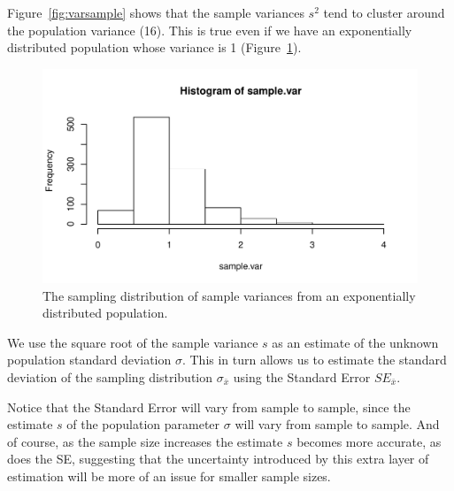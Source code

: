 \documentclass[12pt]{book}\usepackage[]{graphicx}\usepackage[]{color}
\makeatletter
\def\maxwidth{ %
  \ifdim\Gin@nat@width>\linewidth
    \linewidth
  \else
    \Gin@nat@width
  \fi
}
\newenvironment{knitrout}{}{} %
\makeatother
\begin{document}
Figure~\ref{fig:varsample} shows that the sample variances $s^2$ tend to cluster around the population variance (16). 
This is true even if  we have an exponentially distributed population whose variance is 1 (Figure~\ref{fig:varsampleexp}).



\begin{figure}[!htbp]
  \centering
\begin{knitrout}
\color{fgcolor}
\includegraphics[width=\maxwidth]{figure/unnamed-chunk-27-1} 

\end{knitrout}
  \caption{The sampling distribution of sample variances from an exponentially distributed population.}
  \label{fig:varsampleexp}
\end{figure}

We use the square root of the sample variance  $s$ as an estimate of the unknown population standard
deviation $\sigma$. This in turn allows us to estimate the standard deviation of the sampling distribution $\sigma_{\bar{x}}$ using the Standard Error $SE_{\bar{x}}$.

Notice that the Standard Error will vary from sample to sample, since the estimate $s$ of the population parameter $\sigma$ will vary from sample to sample. And of course, as the sample size increases the estimate $s$ becomes more accurate, as does the SE, suggesting that the uncertainty introduced by this extra layer of estimation will be more of an issue for smaller sample sizes.
\end{document}
